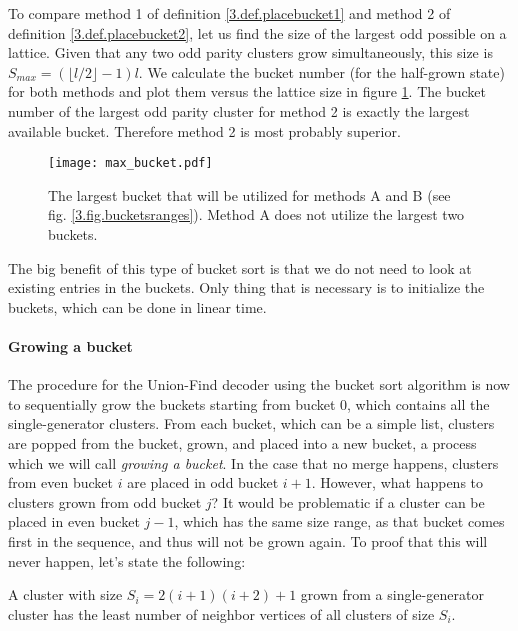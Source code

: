 To compare method 1 of definition \ref{3.def.placebucket1} and method 2 of definition \ref{3.def.placebucket2}, let us find the size of the largest odd possible on a lattice. Given that any two odd parity clusters grow simultaneously, this size is $S_{max} = (\lfloor l/2\rfloor-1)l$. We calculate the bucket number (for the half-grown state) for both methods and plot them versus the lattice size in figure \ref{3.fig.maxbucket}. The bucket number of the largest odd parity cluster for method 2 is exactly the largest available bucket. Therefore method 2 is most probably superior.

\begin{figure}[h]
  \centering
  \texttt{[image: max\_bucket.pdf]}
  \caption{The largest bucket that will be utilized for methods A and B (see fig. \ref{3.fig.bucketsranges}). Method A does not utilize the largest two buckets. }\label{3.fig.maxbucket}
\end{figure}

The big benefit of this type of bucket sort is that we do not need to look at existing entries in the buckets. Only thing that is necessary is to initialize the buckets, which can be done in linear time.

\paragraph{Growing a bucket}

The procedure for the Union-Find decoder using the bucket sort algorithm is now to sequentially grow the buckets starting from bucket 0, which contains all the single-generator clusters. From each bucket, which can be a simple list, clusters are popped from the bucket, grown, and placed into a new bucket, a process which we will call \emph{growing a bucket}. In the case that no merge happens, clusters from even bucket $i$ are placed in odd bucket $i+1$. However, what happens to clusters grown from odd bucket $j$? It would be problematic if a cluster can be placed in even bucket $j-1$, which has the same size range, as that bucket comes first in the sequence, and thus will not be grown again. To proof that this will never happen, let's state the following:

\begin{lemma}
  A cluster with size $S_i = 2(i+1)(i+2) + 1$ grown from a single-generator cluster has the least number of neighbor vertices of all clusters of size $S_i$.
\end{lemma}

